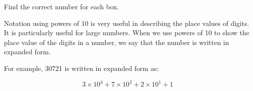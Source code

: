 \begin{examples}
    \begin{questions}
        \Question[3] Find the correct number for each box.
    \end{questions}
\end{examples}

Notation using powers of 10 is very useful in describing the place values of digits. It is particularly useful for large numbers. When we use powers of 10 to show the place value of the digits in a number, we say that the number is written in expanded form.

For example, 30721 is written in expanded form as:

\[
3 \times 10^{4}+7 \times 10^{2}+2 \times 10^{1}+1
\]

